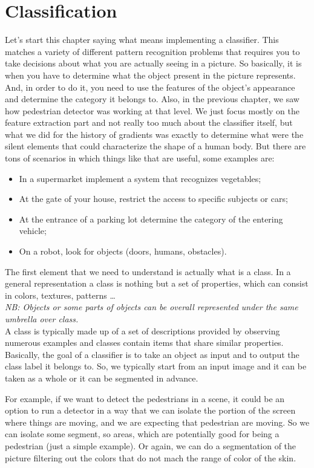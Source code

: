 \chapter{Classification}
Let's start this chapter saying what means implementing a classifier.
This matches a variety of different pattern recognition problems that requires you to take decisions about what you are actually seeing in a picture.
So basically, it is when you have to determine what the object present in the picture represents.
And, in order to do it, you need to use the features of the object's appearance and determine the category it belongs to.
Also, in the previous chapter, we saw how pedestrian detector was working at that level. 
We just focus mostly on the feature extraction part and not really too much about the classifier itself, 
but what we did for the history of gradients was exactly to determine what were the silent elements 
that could characterize the shape of a human body. 
But there are tons of scenarios in which things like that are useful, some examples are:
\begin{itemize}
    \item In a supermarket implement a system that recognizes vegetables;
    \item At the gate of your house, restrict the access to specific subjects or cars;
    \item At the entrance of a parking lot determine the category of the entering vehicle;
    \item On a robot, look for objects (doors, humans, obstacles).
\end{itemize}
The first element that we need to understand is actually what is a class.
In a general representation a class is nothing but a set of properties, which can consist in colors, textures, patterns \dots
\\\textit{NB: Objects or some parts of objects can be overall represented under the same umbrella over class.}
\\
A class is typically made up of a set of descriptions provided by observing numerous examples and classes contain items that share similar properties.
Basically, the goal of a classifier is to take an object as input and to output the class label it belongs to.
So, we typically start from an input image and it can be taken as a whole or it can be segmented in advance. 

For example, if we want to detect the pedestrians in a scene, it could be an option to run a detector in a way that we can isolate the portion of the screen where things are moving, and we are expecting that pedestrian are moving.
So we can isolate some segment, so areas, which are potentially good for being a pedestrian (just a simple example).
Or again, we can do a segmentation of the picture filtering out the colors that do not mach the range of color of the skin.

